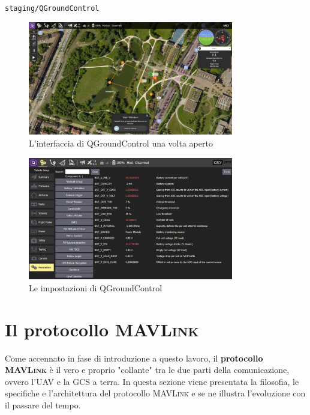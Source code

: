 \documentclass[a4paper, 12pt, oneside]{article}
\theoremstyle{definition}
\begin{document}
\begin{center}
    \texttt{staging/QGroundControl}
\end{center}

\begin{figure}[H]
    \centering
    \includegraphics[width=0.8\textwidth]{images/QGroundCotrol-Interface.jpg}
    \caption{L'interfaccia di QGroundControl una volta aperto}
\end{figure}

\begin{figure}[H]
    \centering
    \includegraphics[width=0.8\textwidth]{images/QGroundControl-settings.jpg}
    \caption{Le impostazioni di QGroundControl}
\end{figure}

\section{Il protocollo \textsc{MAVLink}}

Come accennato in fase di introduzione a questo lavoro, il \textbf{protocollo \textsc{MAVLink}} è il vero e proprio "collante" tra le due parti della comunicazione, ovvero l'UAV e la GCS a terra. In questa sezione viene presentata la filosofia, le specifiche e l'architettura del protocollo \textsc{MAVLink} e se ne illustra l'evoluzione con il passare del tempo.
\end{document}
